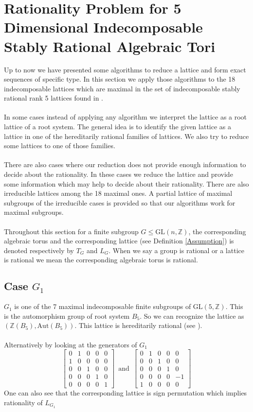 \documentclass{article}
\theoremstyle{plain}
\theoremstyle{definition}
\newcommand{\Z}{\ensuremath{\mathbb{Z}}}
\newcommand{\tand}{\ensuremath{\,\,\, \text{and} \,\,\,}}
\begin{document}
\section{Rationality Problem for 5 Dimensional Indecomposable Stably Rational Algebraic Tori}
Up to now we have presented some algorithms to reduce a lattice and form exact sequences of specific type. In this section we apply those algorithms to the 18 indecomposable lattices which are maximal in the set of indecomposable stably rational rank 5 lattices found in \cite{Hoshi}.\\
\\
In some cases instead of applying any algorithm we interpret the lattice as a root lattice of a root system. The general idea is to identify the given lattice as a lattice in one of the hereditarily rational families of lattices. We also try to reduce some lattices to one of those families.\\
\\
There are also cases where our reduction does not provide enough information to decide about the rationality. In these cases we reduce the lattice and provide some information which may help to decide about their rationality. There are also irreducible lattices among the 18 maximal ones. A partial lattice of maximal subgroups of the irreducible cases is provided so that our algorithms work for maximal subgroups.\\
\\
Throughout this section for a finite subgroup $G \leq \mathrm{GL}(n,\Z)$, the corresponding algebraic torus and the corresponding lattice (see Definition \ref{Assumption}) is denoted respectively by $T_G$ and $L_G$. When we say a group is rational or a lattice is rational we mean the corresponding algebraic torus is rational.
\bigskip
\subsection{Case $G_1$}
$G_1$ is one of the 7 maximal indecomposable finite subgroups of $\mathrm{GL}(5,\mathbb{Z})$. This is the automorphism group of root system $B_5$. So we can recognize the lattice as $(\mathbb{Z}(B_5), \mathrm{Aut}(B_5))$. This lattice is hereditarily rational (see \cite{Nicole1}).\\
\\
Alternatively by looking at the generators of $G_1$
$$
\left[ \begin {array}{ccccc} 0&1&0&0&0\\ 1&0&0&0&0
\\ 0&0&1&0&0\\ 0&0&0&1&0
\\ 0&0&0&0&1\end {array} \right] 
\tand
 \left[ \begin {array}{ccccc} 0&1&0&0&0\\ 0&0&1&0&0
\\ 0&0&0&1&0\\ 0&0&0&0&-1
\\ 1&0&0&0&0\end {array} \right] 
$$
One can also see that the corresponding lattice is sign permutation which implies rationality of $L_{G_1}$
\end{document}
